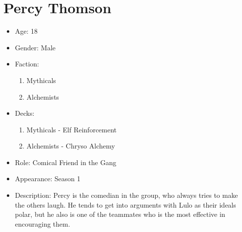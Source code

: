 \section{Percy Thomson}
\begin{itemize}
	\item Age: 18
	\item Gender: Male
	\item Faction:
	      \begin{enumerate}
		      \item Mythicals
		      \item Alchemists
	      \end{enumerate}
	\item Decks:
	      \begin{enumerate}
		      \item Mythicals - Elf Reinforcement
		      \item Alchemists - Chryso Alchemy
	      \end{enumerate}
	\item Role: Comical Friend in the Gang
	\item Appearance: Season 1
	\item Description: Percy is the comedian in the group, who
	      always tries to make the others laugh. He tends to get into
	      arguments with Lulo as their ideals polar, but he also is one of
	      the teammates who is the most effective in encouraging them.
\end{itemize}
\newpage